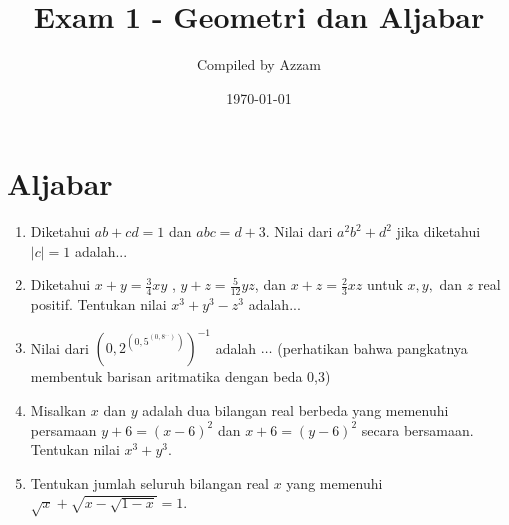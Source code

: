 \documentclass[12pt]{scrartcl}
\title{Exam 1 - Geometri dan Aljabar} %
\date{\today}
\author{Compiled by Azzam}
\begin{document}
\maketitle
\section{Aljabar}
\begin{enumerate}
      \item
		Diketahui $ab+cd=1$ dan $abc=d+3$. Nilai dari $a^2b^2+d^2$ jika diketahui $|c|=1$ adalah...


	\item
		Diketahui $x+y=\frac34 xy$ , $y+z=\frac{5}{12}yz$, dan $x+z=\frac23xz$ untuk $x,y,$ dan $z$ real positif. Tentukan nilai $x^3+y^3-z^3$ adalah...


		\item Nilai dari $\left(0,2 ^{\left(0,5 ^{\left(0,8 ^{...} \right)} \right)} \right)^{-1}$ adalah $\dots$ (perhatikan bahwa pangkatnya membentuk barisan aritmatika dengan beda 0,3)

    \item
		Misalkan $x$ dan $y$ adalah dua bilangan real berbeda yang memenuhi persamaan $y+6 = (x-6)^2$ dan $x+6 = (y-6)^2$ secara bersamaan. Tentukan nilai $x^3+y^3$.

		\item Tentukan jumlah seluruh bilangan real $x$ yang memenuhi $\sqrt{x}+\sqrt{x-\sqrt{1-x}}=1$.
\end{enumerate}

\
\end{document}
